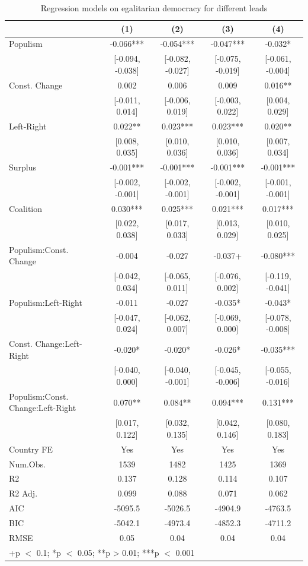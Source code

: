 \documentclass[
  abstract]{article}
\begin{document}
\hypertarget{tbl-leadegaldem}{}
\begin{table}
\caption{\label{tbl-leadegaldem}Regression models on egalitarian democracy for different leads }\tabularnewline

\centering\centering\centering
\begin{tabular}[t]{lcccc}
\toprule
  & (1) & (2) & (3) & (4)\\
\midrule
Populism & -0.066*** & -0.054*** & -0.047*** & -0.032*\\
 & {}[-0.094, -0.038] & {}[-0.082, -0.027] & {}[-0.075, -0.019] & {}[-0.061, -0.004]\\
Const. Change & 0.002 & 0.006 & 0.009 & 0.016**\\
 & {}[-0.011, 0.014] & {}[-0.006, 0.019] & {}[-0.003, 0.022] & {}[0.004, 0.029]\\
Left-Right & 0.022** & 0.023*** & 0.023*** & 0.020**\\
 & {}[0.008, 0.035] & {}[0.010, 0.036] & {}[0.010, 0.036] & {}[0.007, 0.034]\\
Surplus & -0.001*** & -0.001*** & -0.001*** & -0.001***\\
 & {}[-0.002, -0.001] & {}[-0.002, -0.001] & {}[-0.002, -0.001] & {}[-0.001, -0.001]\\
Coalition & 0.030*** & 0.025*** & 0.021*** & 0.017***\\
 & {}[0.022, 0.038] & {}[0.017, 0.033] & {}[0.013, 0.029] & {}[0.010, 0.025]\\
Populism:Const. Change & -0.004 & -0.027 & -0.037+ & -0.080***\\
 & {}[-0.042, 0.034] & {}[-0.065, 0.011] & {}[-0.076, 0.002] & {}[-0.119, -0.041]\\
Populism:Left-Right & -0.011 & -0.027 & -0.035* & -0.043*\\
 & {}[-0.047, 0.024] & {}[-0.062, 0.007] & {}[-0.069, 0.000] & {}[-0.078, -0.008]\\
Const. Change:Left-Right & -0.020* & -0.020* & -0.026* & -0.035***\\
 & {}[-0.040, 0.000] & {}[-0.040, -0.001] & {}[-0.045, -0.006] & {}[-0.055, -0.016]\\
Populism:Const. Change:Left-Right & 0.070** & 0.084** & 0.094*** & 0.131***\\
 & {}[0.017, 0.122] & {}[0.032, 0.135] & {}[0.042, 0.146] & {}[0.080, 0.183]\\
\midrule
Country FE & Yes & Yes & Yes & Yes\\
Num.Obs. & 1539 & 1482 & 1425 & 1369\\
R2 & 0.137 & 0.128 & 0.114 & 0.107\\
R2 Adj. & 0.099 & 0.088 & 0.071 & 0.062\\
AIC & -5095.5 & -5026.5 & -4904.9 & -4763.5\\
BIC & -5042.1 & -4973.4 & -4852.3 & -4711.2\\
RMSE & 0.05 & 0.04 & 0.04 & 0.04\\
\bottomrule
\multicolumn{5}{l}{\rule{0pt}{1em}+p $<$ 0.1; *p $<$ 0.05; **p > 0.01; ***p $<$ 0.001}\\
\end{tabular}
\end{table}
\end{document}
